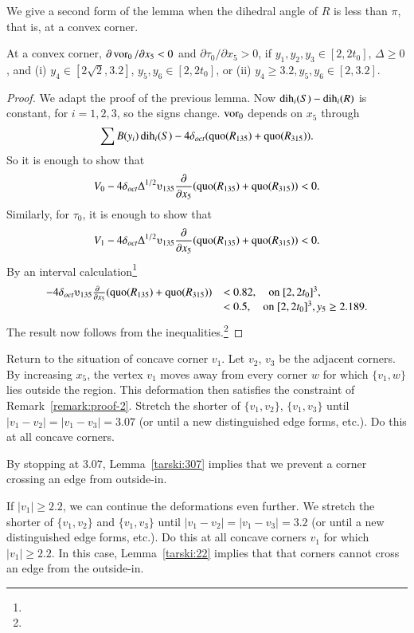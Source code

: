 We give a second form of the lemma when the dihedral angle of $R$ is
less than $\pi$, that is, at a convex corner.


\begin{lemma}
At a convex corner, $\partial \operatorname{vor}_0/\partial x_5 <0$ and
    $\partial \tau_0/\partial x_5>0$, if $y_1,y_2,y_3\in[2,2t_0]$,
$\Delta\ge0$, and (i) $y_4\in[2\sqrt{2},3.2]$, $y_5,y_6\in[2,2t_0]$, or
(ii) $y_4\ge 3.2, y_5,y_6\in[2,3.2]$.
\end{lemma}

\begin{proof}
We adapt the proof of the previous lemma.  Now
$\operatorname{dih}_i(S)-\operatorname{dih}_i(R)$ is constant, for $i=1,2,3$, so the signs change.
$\operatorname{vor}_0$ depends on $x_5$ through
$$\sum B(y_i)\operatorname{dih}_i(S) - 4\delta_{oct} (\operatorname{quo}(R_{135})+\operatorname{quo}(R_{315})).$$
So it is enough to show that
    $$
    V_0 - 4\doct\Delta^{1/2}\ups_{135}\frac{\partial}{\partial x_5}
    (\quo(R_{135})+\quo(R_{315}))<0.
    $$
Similarly, for $\tau_0$, it is enough to show that
    $$
        V_1 - 4\doct\Delta^{1/2}\ups_{135}\frac{\partial}{\partial x_5}
    (\quo(R_{135})+\quo(R_{315}))<0.
    $$
By an interval calculation\footnote{} %
    $$
    \begin{array}{lll}
    -4\doct  \ups_{135}\frac{\partial\phantom{x}}{\partial x_5}
    (\quo(R_{135})+\quo(R_{315}))&< 0.82,\quad\hbox{on } [2,2t_0]^3,\\
                            &<0.5,\quad\hbox{on }[2,2t_0]^3, y_5\ge2.189.
    \end{array}
    $$
The result now follows from
the inequalities.\footnote{} %
\end{proof}

Return to the situation of concave corner $v_1$. Let $v_2$, $v_3$ be the
adjacent corners. By increasing $x_5$, the vertex $v_1$ moves away from
every corner $w$ for which $\{v_1,w\}$ lies outside the region.  This
deformation then satisfies the constraint of
Remark~\ref{remark:proof-2}. Stretch the shorter of $\{v_1,v_2\}$,
$\{v_1,v_3\}$ until $|v_1-v_2|=|v_1-v_3|=3.07$ (or until a new
distinguished edge forms, etc.).  Do this at all concave corners.

By stopping at $3.07$, Lemma~\ref{tarski:307} implies that we prevent a corner crossing an edge from
outside-in. 

If $|v_1|\ge2.2$, we can continue the deformations even further. We
stretch the shorter of $\{v_1,v_2\}$ and $\{v_1,v_3\}$ until
$|v_1-v_2|=|v_1-v_3|=3.2$ (or until a new distinguished edge forms,
etc.).  Do this at all concave corners $v_1$ for which $|v_1|\ge2.2$.  In this case, Lemma~\ref{tarski:22} implies that that corners cannot cross an edge from the outside-in.






